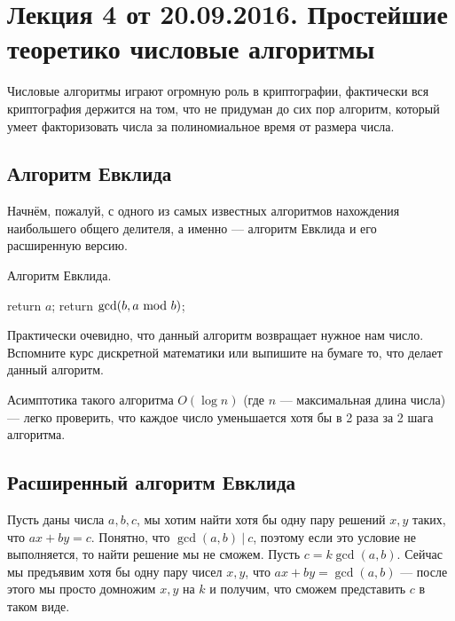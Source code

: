 \documentclass[a4paper, 12pt]{article}
\begin{document}
\pagestyle{fancy}

\section{Лекция 4 от 20.09.2016. Простейшие теоретико числовые алгоритмы}

Числовые алгоритмы играют огромную роль в криптографии, фактически вся криптография
держится на том, что не придуман до сих пор алгоритм, который умеет факторизовать числа за
полиномиальное время от размера числа.

\subsection{Алгоритм Евклида}

Начнём, пожалуй, с одного из самых известных алгоритмов нахождения наибольшего
общего делителя, а именно --- алгоритм Евклида и его расширенную версию.

\begin{algorithm}
  \caption{Алгоритм Евклида.}
  \begin{algorithmic}[1]
        \State return $a$;
      \Else
        \State return $\gcd(b, a \ \text{mod} \  b)$;
      \EndIf
    \EndFunction
  \end{algorithmic}
\end{algorithm}

Практически очевидно, что данный алгоритм возвращает нужное нам число.
Вспомните курс дискретной математики или выпишите на бумаге то,
что делает данный алгоритм. 

Асимптотика такого алгоритма $O(\log n)$ (где $n$ --- максимальная длина числа)
--- легко проверить, что каждое число уменьшается хотя бы в 2 раза за 2 шага алгоритма.

\subsection{Расширенный алгоритм Евклида}

Пусть даны числа $a, b, c$, мы хотим найти хотя бы одну пару решений $x, y$ таких,
что $ax + by = c$. Понятно, что $\gcd(a, b) \ | \ c$, поэтому если это условие
не выполняется, то найти решение мы не сможем. Пусть $c = k \gcd(a, b)$. Сейчас
мы предъявим хотя бы одну пару чисел $x, y$, что $ax + by = \gcd(a, b)$ --- после этого
мы просто домножим $x, y$ на $k$ и получим, что сможем представить $c$ в таком
виде.
\end{document}
